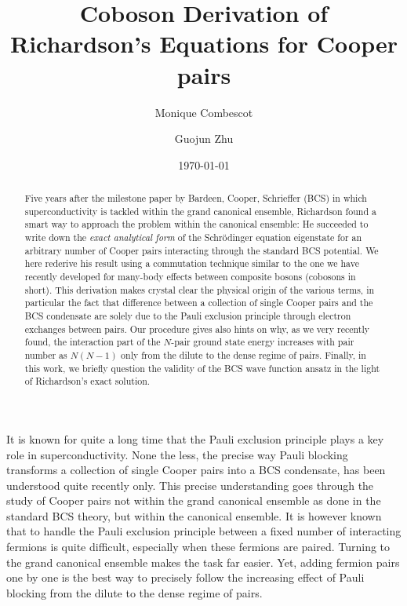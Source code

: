 \documentclass[aps,prb,superscriptaddress,showpacs,reprint,lengthcheck]{revtex4-1}
\begin{document}
\title{Coboson Derivation of Richardson's Equations for Cooper pairs}
\author{Monique Combescot}
\author{Guojun Zhu}

\date{\today}

\begin{abstract}
Five years after the milestone paper by Bardeen, Cooper, Schrieffer (BCS) in which
superconductivity is tackled within the grand canonical ensemble, 
Richardson found a smart way to approach the problem within the canonical ensemble: He succeeded to
write down the \textit{exact analytical form} of the Schr\"{o}dinger equation eigenstate for
an arbitrary number of Cooper pairs interacting through the standard BCS
potential. We here rederive his result using a commutation technique similar to the one we
have recently developed for many-body effects between composite bosons
(cobosons in short). This derivation makes crystal clear the physical origin of the various terms, in particular the fact that difference
between a collection of single Cooper pairs and the BCS condensate are solely due to the Pauli exclusion principle
through electron exchanges between pairs. Our procedure gives also hints on
why, as we very recently found, the interaction part of the $N$-pair ground state energy
increases with pair number as $N(N-1)$ only from the dilute to the dense regime
of pairs. Finally, in this work, we briefly question the validity of the BCS wave
function ansatz in the light of Richardson's exact solution.
\end{abstract}

\maketitle


It is known for quite a long time that the Pauli exclusion principle
plays a key role in superconductivity. None the less, the
precise way Pauli blocking transforms a collection of single Cooper pairs into a BCS
condensate, has been understood quite recently only. This precise understanding goes through
the study of Cooper pairs not within the grand canonical ensemble as done in the
standard BCS theory, but within the canonical ensemble. It is however  known that to handle the
Pauli exclusion principle between a fixed number of interacting fermions is quite difficult, especially when these fermions are paired. 
Turning to the grand canonical ensemble makes the task far easier. Yet, adding fermion pairs one by
one is the best way to precisely follow the increasing effect of Pauli
blocking from the dilute to the dense regime of pairs.
\end{document}
